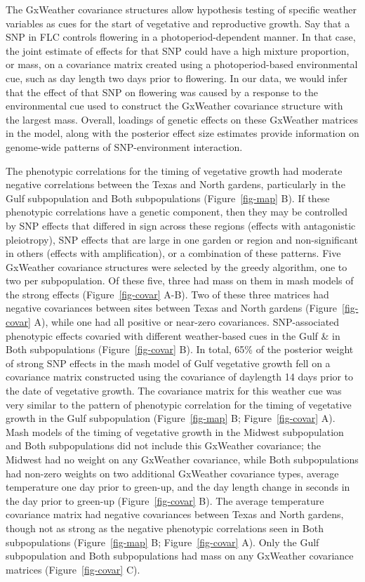 \documentclass[
  9pt,
  twocolumn,
  twoside]{pnas-new}
\begin{document}
The GxWeather covariance structures allow hypothesis testing of specific
weather variables as cues for the start of vegetative and reproductive
growth. Say that a SNP in FLC controls flowering in a
photoperiod-dependent manner. In that case, the joint estimate of
effects for that SNP could have a high mixture proportion, or mass, on a
covariance matrix created using a photoperiod-based environmental cue,
such as day length two days prior to flowering. In our data, we would
infer that the effect of that SNP on flowering was caused by a response
to the environmental cue used to construct the GxWeather covariance
structure with the largest mass. Overall, loadings of genetic effects on
these GxWeather matrices in the model, along with the posterior effect
size estimates provide information on genome-wide patterns of
SNP-environment interaction.

The phenotypic correlations for the timing of vegetative growth had
moderate negative correlations between the Texas and North gardens,
particularly in the Gulf subpopulation and Both subpopulations
(Figure~\ref{fig-map} B). If these phenotypic correlations have a
genetic component, then they may be controlled by SNP effects that
differed in sign across these regions (effects with antagonistic
pleiotropy), SNP effects that are large in one garden or region and
non-significant in others (effects with amplification), or a combination
of these patterns. Five GxWeather covariance structures were selected by
the greedy algorithm, one to two per subpopulation. Of these five, three
had mass on them in mash models of the strong effects
(Figure~\ref{fig-covar} A-B). Two of these three matrices had negative
covariances between sites between Texas and North gardens
(Figure~\ref{fig-covar} A), while one had all positive or near-zero
covariances. SNP-associated phenotypic effects covaried with different
weather-based cues in the Gulf \& in Both subpopulations
(Figure~\ref{fig-covar} B). In total, 65\% of the posterior weight of
strong SNP effects in the mash model of Gulf vegetative growth fell on a
covariance matrix constructed using the covariance of daylength 14 days
prior to the date of vegetative growth. The covariance matrix for this
weather cue was very similar to the pattern of phenotypic correlation
for the timing of vegetative growth in the Gulf subpopulation
(Figure~\ref{fig-map} B; Figure~\ref{fig-covar} A). Mash models of the
timing of vegetative growth in the Midwest subpopulation and Both
subpopulations did not include this GxWeather covariance; the Midwest
had no weight on any GxWeather covariance, while Both subpopulations had
non-zero weights on two additional GxWeather covariance types, average
temperature one day prior to green-up, and the day length change in
seconds in the day prior to green-up (Figure~\ref{fig-covar} B). The
average temperature covariance matrix had negative covariances between
Texas and North gardens, though not as strong as the negative phenotypic
correlations seen in Both subpopulations (Figure~\ref{fig-map} B;
Figure~\ref{fig-covar} A). Only the Gulf subpopulation and Both
subpopulations had mass on any GxWeather covariance matrices
(Figure~\ref{fig-covar} C).
\end{document}

